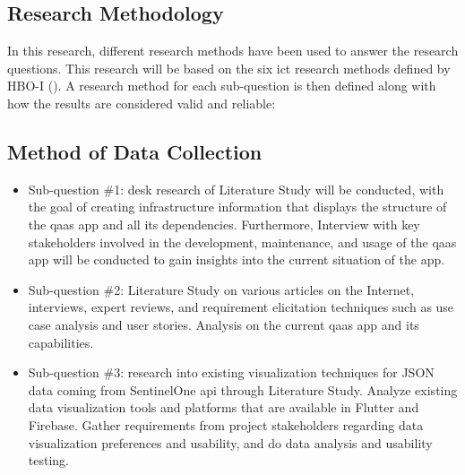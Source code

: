 \begin{multicols}{2}
  \section{Research Methodology}
  In this research, different research methods have been used to answer the research questions. This research
  will be based on the six \acrshort{ict} research methods defined by HBO-I (\cite{ictresearchmethods}). A
  research method for each sub-question is then defined along with how the results are considered valid and
  reliable:
  \subsection{Method of Data Collection}
  \begin{itemize}[label=-]
    \item Sub-question \#1: desk research of Literature Study will be conducted, with the goal of creating
          infrastructure information that displays the structure of the \acrshort{qaas} app and all its
          dependencies. Furthermore, Interview with key stakeholders involved in the  development, maintenance,
          and usage of the \acrshort{qaas} app will be conducted to gain insights into the current situation
          of the app.
    \item Sub-question \#2: Literature Study on various articles on the Internet, interviews, expert reviews,
          and requirement elicitation techniques such as use case analysis and user stories. Analysis on the
          current \acrshort{qaas} app and its capabilities.
    \item Sub-question \#3: research into existing visualization techniques for \gls{JSON} data coming from
          SentinelOne \acrshort{api} through Literature Study. Analyze existing data visualization tools and
          platforms that are available in Flutter and Firebase. Gather requirements from project stakeholders
          regarding data visualization preferences and usability, and do data analysis and usability testing.

\end{itemize}
\end{multicols}
